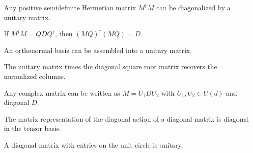 \begin{theorem}\label{thm:svd_spectral}
  \leanok
  Any positive semidefinite Hermetian matrix $M^\dagger M$ can be diagonalized by a unitary matrix.
\end{theorem}

\begin{theorem}\label{thm:conjTranspose_mul_self_of_spectral}
  \leanok
  If $M^\dagger M = Q D Q^\dagger$, then $(M Q)^\dagger (M Q) = D$.
\end{theorem}

\begin{theorem}\label{thm:exists_unitary_of_orthonormalBasis}
  \leanok
  An orthonormal basis can be assembled into a unitary matrix.
\end{theorem}

\begin{theorem}\label{thm:cols_mul_diag_sqrt}
  \leanok
  The unitary matrix times the diagonal square root matrix recovers the normalized columns.
\end{theorem}

\begin{theorem}\label{thm:svd_exists}
  \leanok
  Any complex matrix can be written as $M = U_1 D U_2$ with $U_1, U_2 \in U(d)$ and diagonal $D$.
\end{theorem}

\begin{theorem}\label{thm:toEndMatrix_diagAction_diagonal}
  \leanok
  The matrix representation of the diagonal action of a diagonal matrix is diagonal in the tensor basis.
\end{theorem}

\begin{theorem}\label{thm:diagonal_mem_unitaryGroup}
  \leanok
  A diagonal matrix with entries on the unit circle is unitary.
\end{theorem}

